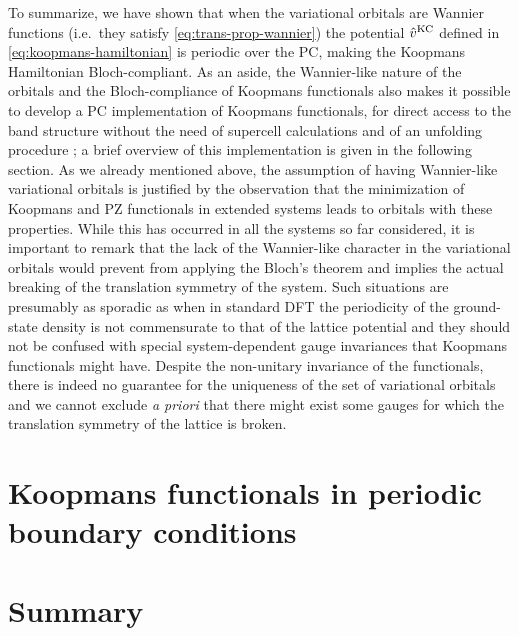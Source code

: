 To summarize, we have shown that when the variational orbitals are Wannier functions (i.e.\ they satisfy \cref{eq:trans-prop-wannier}) the potential $\hat{v}^{\rm KC}$ defined in \cref{eq:koopmans-hamiltonian} is periodic over the PC, making the Koopmans Hamiltonian Bloch-compliant. As an aside, the Wannier-like nature of the orbitals and the Bloch-compliance of Koopmans functionals also makes it possible to develop a PC implementation of Koopmans functionals, for direct access to the band structure without the need of supercell calculations and of an unfolding procedure \cite{colonna_koopmans_2022}; a brief overview of this implementation is given in the following section. As we already mentioned above, the assumption of having Wannier-like variational orbitals is justified by the observation that the minimization of Koopmans and PZ functionals in extended systems leads to orbitals with these properties. While this has occurred in all the systems so far considered, it is important to remark that the lack of the Wannier-like character in the variational orbitals would prevent from applying the Bloch's theorem and implies the actual breaking of the translation symmetry of the system. Such situations are presumably as sporadic as when in standard DFT the periodicity of the ground-state density is not commensurate to that of the lattice potential and they should not be confused with special system-dependent gauge invariances that Koopmans functionals might have. Despite the non-unitary invariance of the functionals, there is indeed no guarantee for the uniqueness of the set of variational orbitals and we cannot exclude \emph{a priori} that there might exist some gauges for which the translation symmetry of the lattice is broken.

\section{Koopmans functionals in periodic boundary conditions\label{sec:koopmans-pbc}}

\section{Summary\label{sec:ch4-summary}}

